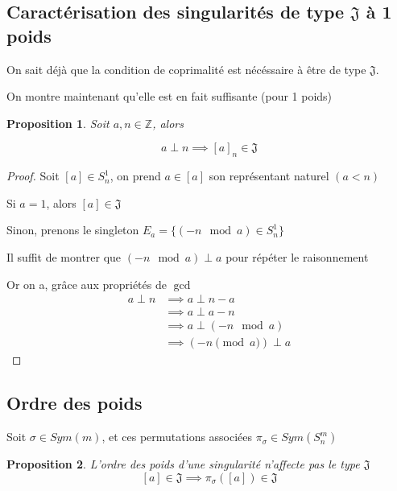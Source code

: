 \documentclass{article}
\newtheorem{proposition}{Proposition}
\begin{document}
\subsection{Caractérisation des singularités de type \texorpdfstring{$\mathfrak{J}$}{J} à 1 poids}

On sait déjà que la condition de coprimalité est nécéssaire à être de type $\mathfrak{J}$. 

On montre maintenant qu'elle est en fait suffisante (pour 1 poids)

\begin{proposition}
    Soit $a, n \in \mathbb{Z}$, alors

    \[ a \perp n \implies {[a]}_n \in \mathfrak{J} \]
\end{proposition}

\begin{proof}
    Soit $[a] \in S_n^1$, on prend $a \in [a]$ son représentant naturel $(a < n)$

    Si $a = 1$, alors $[a] \in \mathfrak{J}$

    Sinon, prenons le singleton $E_a = \{ (-n \mod a) \in S_n^1 \}$

    Il suffit de montrer que $(-n \mod a) \perp a$ pour répéter le raisonnement

    Or on a, grâce aux propriétés de $\gcd$
    \begin{align*}
        a \perp n &\implies a \perp n - a \\
        &\implies a \perp a - n \\
        &\implies a \perp (-n \mod a) \\
        &\implies (-n \pmod a) \perp a
    \end{align*}
\end{proof}

\newpage

\subsection{Ordre des poids}

Soit $\sigma \in Sym(m)$, et ces permutations associées $\pi_{\sigma} \in Sym(S_n^m)$

\begin{proposition}
    L'ordre des poids d'une singularité n'affecte pas le type $\mathfrak{J}$
    \[ [a] \in \mathfrak{J} \implies \pi_{\sigma}([a]) \in \mathfrak{J} \]
\end{proposition}
\end{document}
